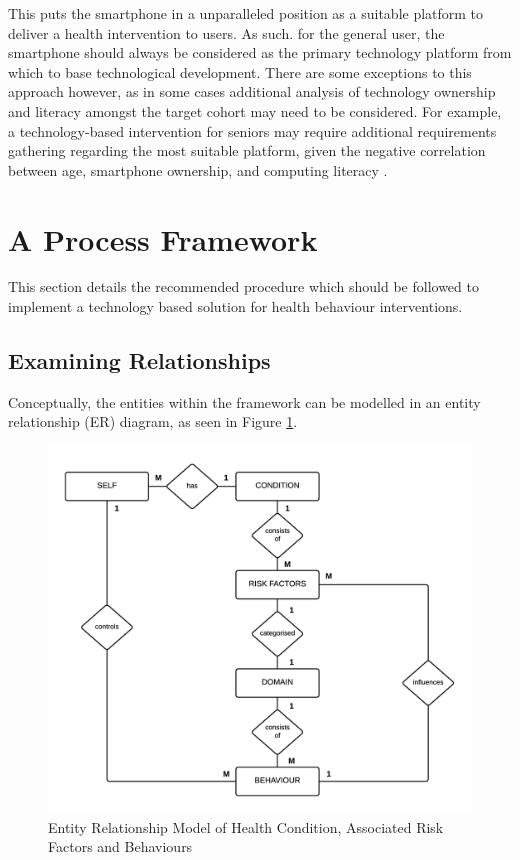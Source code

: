 This puts the smartphone in a unparalleled position as a suitable platform to deliver a health intervention to users. As such. for the general user, the smartphone should always be considered as the primary technology platform from which to base technological development.
There are some exceptions to this approach however, as in some cases additional analysis of technology ownership and literacy amongst the target cohort may need to be considered. For example, a technology-based intervention for seniors may require additional requirements gathering regarding the most suitable platform, given the negative correlation between age, smartphone ownership, and computing literacy \cite{Migo2015}.

\section{A Process Framework}
This section details the recommended procedure which should be followed to implement a technology based solution for health behaviour interventions.

\subsection{Examining Relationships}
Conceptually, the entities within the framework can be modelled in an entity relationship (ER) diagram, as seen in Figure \ref{fig: erd-model}.

\begin{figure}[h]
    \centering
    \includegraphics[scale=0.9, angle=0]{Files/prevention-study-1/figures/erd-riskfactors}
    \caption{Entity Relationship Model of Health Condition, Associated Risk Factors and Behaviours}
    \label{fig: erd-model}
\end{figure}

